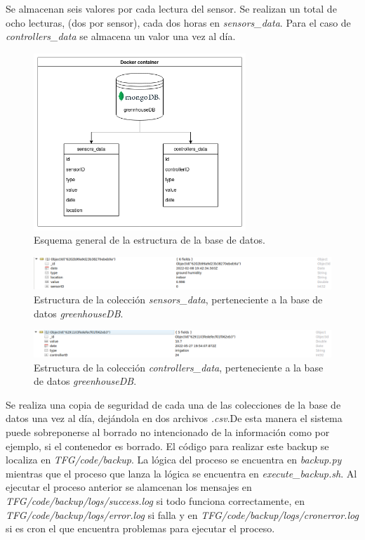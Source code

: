 \documentclass[a4paper, 12pt, oneside]{book}
\begin{document}
Se almacenan seis valores por cada lectura del sensor. Se realizan un total de ocho lecturas, (dos por sensor), cada dos horas en \textit{sensors\_data}. Para el caso de \textit{controllers\_data} se almacena un valor una vez al día.
\begin{figure}[H]
	\centering
    \includegraphics[width=8cm, keepaspectratio]{img/estructura_db}
    \caption{Esquema general de la estructura de la base de datos.}
    \label{figura:estructura_bd}
\end{figure}
\begin{figure}[H]
	\centering
    \includegraphics[width=15cm, keepaspectratio]{img/sensors_data_collection}
    \caption{Estructura de la colección \textit{sensors\_data}, perteneciente a la base de datos \textit{greenhouseDB}.}
    \label{figura:sensors data collection}
\end{figure}
\begin{figure}[H]
	\centering
    \includegraphics[width=15cm, keepaspectratio]{img/controllers_data_collection}
    \caption{Estructura de la colección \textit{controllers\_data}, perteneciente a la base de datos \textit{greenhouseDB}.}
    \label{figura:controllers data collection}
\end{figure}


Se realiza una copia de seguridad de cada una de las colecciones de la base de datos una vez al día, dejándola en dos archivos \textit{.csv}.De esta manera el sistema puede sobreponerse al borrado no intencionado de la información como por ejemplo,  si el contenedor es borrado.
El código para realizar este backup se localiza en \textit{TFG/code/backup}. La lógica del proceso se encuentra en \textit{backup.py} mientras que el proceso que lanza la lógica se encuentra en \textit{execute\_backup.sh}. 
Al ejecutar el proceso anterior se alamcenan los mensajes en \textit{TFG/code/backup/logs/success.log} si todo funciona correctamente, en \textit{TFG/code/backup/logs/error.log} si falla y en \textit{TFG/code/backup/logs/cronerror.log} si es cron el que encuentra problemas para ejecutar el proceso.
\end{document}
